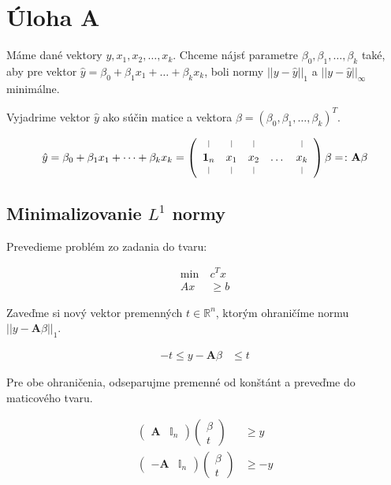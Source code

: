 \documentclass[12pt,oneside,a4paper,slovak]{article}
\newcommand*{\vertbar}{\rule[0ex]{0.3pt}{1.5ex}}
\begin{document}
   

\section*{Úloha A}

Máme dané vektory $y, x_1, x_2, \dots, x_k$. Chceme nájsť parametre $\beta_0, \beta_1,\dots,\beta_k$ také, aby pre vektor $\hat{y} = \beta_0 + \beta_1x_1 + \dots + \beta_kx_k$, boli normy $||y - \hat{y}||_1$ a $||y - \hat{y}||_{\infty}$ minimálne. 

Vyjadrime vektor $\hat{y}$ ako súčin matice a vektora $\beta = (\beta_0, \beta_1, \dots, \beta_k)^T$.

\begin{align*}
	\hat{y} = \beta_0 + \beta_1x_1 + \dots + \beta_kx_k = 
	\left(
		\begin{array}{ccccc}
			\vertbar & \vertbar & \vertbar &  & \vertbar \\
			\mathbf{1}_n & x_1 & x_2 & \dots & x_k \\
			\vertbar & \vertbar & \vertbar &  & \vertbar
		\end{array}
	\right)
	\beta
	=\colon
	\mathbf{A} \beta
\end{align*}

\subsection*{Minimalizovanie $L^1$ normy}

Prevedieme problém zo zadania do tvaru:

\begin{align*}
	\text{min}~ &c^Tx\\
	Ax &\geq b
\end{align*}

Zaveďme si nový vektor premenných $t \in \mathbb{R}^n$, ktorým ohraničíme normu $||y - \mathbf{A} \beta||_1$.

\begin{align*}
	-t \leq y - \mathbf{A} \beta &\leq t
\end{align*}	

Pre obe ohraničenia, odseparujme premenné od konštánt a preveďme do maticového tvaru.

\begin{align*}
	\left(
		\begin{array}{c|c}
			\mathbf{A} & \mathbb{I}_n
		\end{array}
	\right)
	\left(
		\begin{array}{c}
			\beta \\
			\hline
			t
		\end{array}
	\right) &\geq y \\
	\left(
		\begin{array}{c|c}
			-\mathbf{A} & \mathbb{I}_n
		\end{array}
	\right)
	\left(
		\begin{array}{c}
			\beta \\
			\hline
			t
		\end{array}
	\right) &\geq -y
\end{align*}
\end{document}
